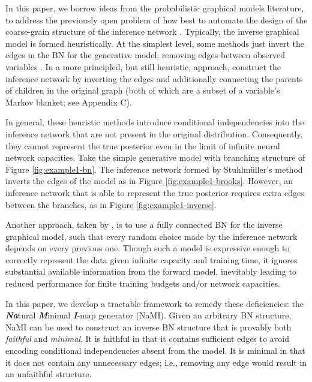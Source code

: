 In this paper, we borrow ideas from the probabilistic graphical models literature, to address the previously open problem of how best to automate the design of the coarse-grain structure of the inference network \citep{Ritchie2016}.
Typically, the inverse graphical model is formed heuristically.
At the simplest level, some methods just invert the edges in the BN for the generative model, removing edges between observed variables \citep{KingmaWelling2013, GanEtAl2015, RanganathEtAl2014}.
In a more principled, but still heuristic, approach, \citet{StuhlmullerEtAl2013,PaigeWood2016} construct the inference network by inverting the edges and additionally connecting the parents of children in the original graph (both of which are a subset of a variable's Markov blanket; see Appendix C). \vspace{-10pt}

In general, these heuristic methods introduce conditional independencies into the inference network that are not present in the original distribution.  Consequently, they cannot represent the true posterior
even in the limit of infinite neural network capacities.
Take the simple generative model with branching structure of Figure \ref{fig:example1-bn}.
The inference network formed by Stuhlm\"{u}ller's method inverts the edges of the model as in Figure \ref{fig:example1-brooks}.
However, an inference network that is able to represent the true posterior requires extra edges between the branches, as in Figure \ref{fig:example1-inverse}.

Another approach, taken by \citet{LeEtAl2016}, is to use a fully connected BN for the inverse graphical model, such that
every random choice made by the inference network depends on every previous one.
Though such a model is expressive enough to correctly represent the data given infinite capacity and training time, it ignores substantial available information from the forward model, inevitably leading to reduced performance for finite
training budgets and/or network capacities.

In this paper, we develop a tractable framework to remedy these deficiencies:
 the
\textbf{\emph{Na}}tural \textbf{\emph{M}}inimal \textbf{\emph{I}}-map generator (NaMI).
Given an arbitrary BN structure, NaMI can be used to construct an inverse BN structure that is provably both \emph{faithful} and \emph{minimal}.
It is faithful in that it contains sufficient edges to avoid encoding conditional independencies absent from the model.
It is minimal in that it does not contain any unnecessary edges; i.e., removing any edge would result in an unfaithful structure.

